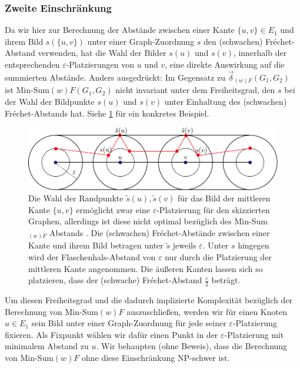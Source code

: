 \documentclass[a4paper, 12pt, twoside]{article}
\theoremstyle{Format1} %
\begin{document}
\subsubsection{Zweite Einschränkung} \label {Zweite Einschränkung}
Da wir hier zur Berechnung der Abstände zwischen einer Kante $\{u,v\} \in E_1$ und ihrem Bild $s(\{u,v\})$ unter einer Graph-Zuordnung $s$ den (schwachen) Fréchet-Abstand verwenden,
hat die Wahl der Bilder $s(u)$ und $s(v)$, innerhalb der entsprechenden $\varepsilon$-Platzierungen von $u$ und $v$, eine direkte Auswirkung auf die summierten Abstände.
Anders ausgedrückt: Im Gegensatz zu $\vec{\delta}_{(w)F}(G_1,G_2)$ ist Min-Sum${(w)F}(G_1,G_2)$ nicht invariant unter dem Freiheitsgrad, den $s$
bei der Wahl der Bildpunkte $s(u)$ und $s(v)$ unter Einhaltung des (schwachen) Fréchet-Abstands hat. Siehe \ref{chapter_3_example_0} für ein konkretes Beispiel.

\begin{figure}[htpb]
    \centering
    \includegraphics[width=\textwidth]{chapter_3_example_0.pdf}
	\caption{Die Wahl der Randpunkte $\tilde{s}(u), \tilde{s}(v)$ für das Bild der mittleren Kante $\{u,v\}$ ermöglicht zwar eine $\varepsilon$-Platzierung
	für den skizzierten Graphen, allerdings ist diese nicht optimal bezüglich des Min-Sum$_{(w)F}$ Abstands .
	Die (schwachen) Fréchet-Abstände zwischen einer Kante und ihrem Bild betragen unter $\tilde{s}$ jeweils $\varepsilon$.
	Unter $s$ hingegen wird der Flaschenhals-Abstand von $\varepsilon$ nur durch die Platzierung der mittleren Kante angenommen.
	Die äußeren Kanten lassen sich so platzieren, dass der (schwache) Fréchet-Abstand $\frac{\varepsilon}{2}$ beträgt.
	}
    \label{chapter_3_example_0}
\end{figure}

Um diesen Freiheitsgrad und die dadurch implizierte Komplexität bezüglich der Berechnung von Min-Sum${(w)F}$ auszuschließen,
werden wir für einen Knoten $u \in E_1$ sein Bild unter einer Graph-Zuordnung für jede seiner $\varepsilon$-Platzierung fixieren.
Als Fixpunkt wählen wir dafür einen Punkt in der $\varepsilon$-Platzierung mit minimalem Abstand zu $u$.
Wir behaupten (ohne Beweis), dass die Berechnung von Min-Sum${(w)F}$ ohne diese Einschränkung NP-schwer ist.
\end{document}

